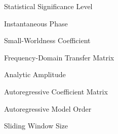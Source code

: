\documentclass[
	12pt,				%
	oneside,
	a4paper,			%
	chapter=TITLE,
	brazil,				%
	english,			%
	]{abntex2}
\begin{document}
\begin{simbolos}
  \item[$\alpha$] Statistical Significance Level
  \item[$\phi(t)$] Instantaneous Phase
  \item[$\sigma$] Small-Worldness Coefficient
  \item[$A(f)$] Frequency-Domain Transfer Matrix
  \item[$A(t)$] Analytic Amplitude
  \item[$A\_r$] Autoregressive Coefficient Matrix
  \item[$p$] Autoregressive Model Order
  \item[$W$] Sliding Window Size
\end{simbolos}

\tableofcontents*
\cleardoublepage

\textual
















% 
\postextual



%

\end{document}
